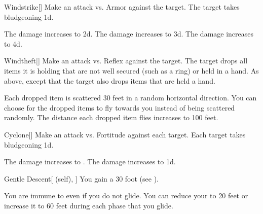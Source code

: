 \lowercase{\hypertarget{spell:Windstrike}{}}\label{spell:Windstrike}
\begin{freeability}[Rank 1]{\hypertarget{spell:Windstrike}{Windstrike}}[]
Make an attack vs. Armor against the target.
\hit The target takes bludgeoning  \plus1d.

\rankline
{} The damage increases to  \plus2d.
 The damage increases to  \plus3d.
 The damage increases to  \plus4d.
\end{freeability}
\vspace{0.25em}



\lowercase{\hypertarget{spell:Windtheft}{}}\label{spell:Windtheft}
\begin{freeability}[Rank 1]{\hypertarget{spell:Windtheft}{Windtheft}}[]
Make an attack vs. Reflex against the target.
\hit The target drops all items it is holding that are not well secured (such as a ring) or held in a hand.
\crit As above, except that the target also drops items that are held a hand.

\rankline
{} Each dropped item is scattered 30 feet in a random horizontal direction.
 You can choose for the dropped items to fly towards you instead of being scattered randomly.
 The distance each dropped item flies increases to 100 feet.
\end{freeability}
\vspace{0.25em}



\lowercase{\hypertarget{spell:Cyclone}{}}\label{spell:Cyclone}
\begin{freeability}[Rank 3]{\hypertarget{spell:Cyclone}{Cyclone}}[]
Make an attack vs. Fortitude against each target.
\hit Each target takes bludgeoning  \minus1d.

\rankline
{} The damage increases to .
 The damage increases to  \plus1d.
\end{freeability}
\vspace{0.25em}



\lowercase{\hypertarget{spell:Gentle Descent}{}}\label{spell:Gentle Descent}
\begin{attuneability}[Rank 3]{\hypertarget{spell:Gentle Descent}{Gentle Descent}}[ (self), ]
You gain a 30 foot  (see ).

\rankline
{} You are immune to  even if you do not glide.
 You can reduce your  to 20 feet or increase it to 60 feet during each phase that you glide.
\end{attuneability}
\vspace{0.25em}



